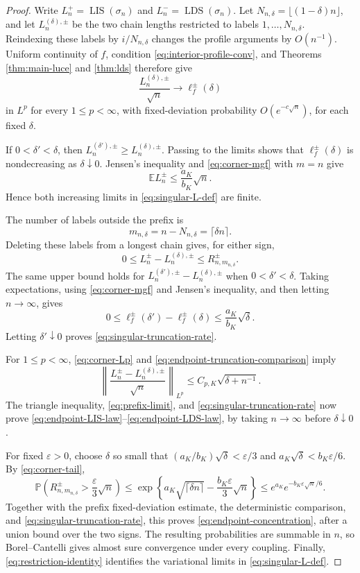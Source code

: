 \documentclass[11pt]{article}
\theoremstyle{remark}
\newcommand{\Pp}{\mathbb P}
\newcommand{\Ee}{\mathbb E}
\newcommand{\LIS}{\operatorname{LIS}}
\newcommand{\LDS}{\operatorname{LDS}}
\newcommand{\eps}{\varepsilon}
\newcommand{\norm}[1]{\left\lVert #1\right\rVert}
\begin{document}
\begin{proof}
Write $L_n^+=\LIS(\sigma_n)$ and $L_n^-=\LDS(\sigma_n)$.
Let $N_{n,\delta}=\lfloor(1-\delta)n\rfloor$, and let
$L_n^{(\delta),\pm}$ be the two chain lengths restricted to labels
$1,\dots,N_{n,\delta}$.  Reindexing these labels by $i/N_{n,\delta}$
changes the profile arguments by $O(n^{-1})$.  Uniform continuity of $f$,
condition \eqref{eq:interior-profile-conv}, and Theorems
\ref{thm:main-luce} and \ref{thm:lds} therefore give
\begin{equation}\label{eq:prefix-limit}
        \frac{L_n^{(\delta),\pm}}{\sqrt n}
        \longrightarrow\ell_f^{\pm}(\delta)
\end{equation}
in $L^p$ for every $1\le p<\infty$, with fixed-deviation probability
$O(e^{-c\sqrt n})$, for each fixed $\delta$.

If $0<\delta'<\delta$, then
$L_n^{(\delta'),\pm}\ge L_n^{(\delta),\pm}$.  Passing to the limits
shows that $\ell_f^{\pm}(\delta)$ is nondecreasing as
$\delta\downarrow0$.  Jensen's inequality and
\eqref{eq:corner-mgf} with $m=n$ give
\[
        \Ee L_n^{\pm}\le\frac{a_K}{b_K}\sqrt n.
\]
Hence both increasing limits in \eqref{eq:singular-L-def} are finite.

The number of labels outside the prefix is
\[
        m_{n,\delta}=n-N_{n,\delta}=\lceil\delta n\rceil.
\]
Deleting these labels from a longest chain gives, for either sign,
\begin{equation}\label{eq:endpoint-truncation-comparison}
 0\le L_n^{\pm}-L_n^{(\delta),\pm}
 \le R_{n,m_{n,\delta}}^{\pm}.
\end{equation}
The same upper bound holds for
$L_n^{(\delta'),\pm}-L_n^{(\delta),\pm}$ when $0<\delta'<\delta$.
Taking expectations, using \eqref{eq:corner-mgf} and Jensen's inequality,
and then letting $n\to\infty$, gives
\[
 0\le\ell_f^{\pm}(\delta')-\ell_f^{\pm}(\delta)
 \le\frac{a_K}{b_K}\sqrt\delta.
\]
Letting $\delta'\downarrow0$ proves
\eqref{eq:singular-truncation-rate}.

For $1\le p<\infty$, \eqref{eq:corner-Lp} and
\eqref{eq:endpoint-truncation-comparison} imply
\[
 \norm{\frac{L_n^{\pm}-L_n^{(\delta),\pm}}{\sqrt n}}_{L^p}
 \le C_{p,K}\sqrt{\delta+n^{-1}}.
\]
The triangle inequality, \eqref{eq:prefix-limit}, and
\eqref{eq:singular-truncation-rate} now prove
\eqref{eq:endpoint-LIS-law}--\eqref{eq:endpoint-LDS-law}, by taking
$n\to\infty$ before $\delta\downarrow0$.

For fixed $\eps>0$, choose $\delta$ so small that
$(a_K/b_K)\sqrt\delta<\eps/3$ and
$a_K\sqrt\delta<b_K\eps/6$.  By \eqref{eq:corner-tail},
\[
 \Pp\left(R_{n,m_{n,\delta}}^{\pm}>
                  \frac{\eps}{3}\sqrt n\right)
 \le
 \exp\left\{a_K\sqrt{\lceil\delta n\rceil}
              -\frac{b_K\eps}{3}\sqrt n\right\}
 \le e^{a_K}e^{-b_K\eps\sqrt n/6}.
\]
Together with the prefix fixed-deviation estimate, the deterministic
comparison, and \eqref{eq:singular-truncation-rate}, this proves
\eqref{eq:endpoint-concentration}, after a union bound over the two signs.
The resulting probabilities are summable in $n$, so Borel--Cantelli gives
almost sure convergence under every coupling.  Finally,
\eqref{eq:restriction-identity} identifies the variational limits in
\eqref{eq:singular-L-def}.
\end{proof}
\end{document}
